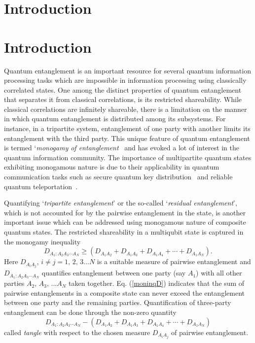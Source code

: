 \documentclass[pra,a4paper,showpacs,superscriptaddress]{revtex4}
\newcommand{\be}{\begin{equation}}
\newcommand{\ee}{\end{equation}}
\begin{document}
\section{Introduction} \section{Introduction} 
Quantum entanglement is an important resource for several quantum information processing tasks which are impossible in information processing using classically correlated states. One among the distinct properties of quantum entanglement that separates it from classical correlations, is its restricted shareability. While classical correlations are infinitely shareable, there is a limitation on the manner in which quantum entanglement is distributed among its subsystems. For instance, in a tripartite system, entanglement of one party with another limits its entanglement with the third party. This unique feature of quantum entanglement is termed `{\emph{monogamy of entanglement}}~\cite{ckw} and has evoked a lot of interest
\cite{ckw,osb,denw,ter,kw2,bs1,proof,hd,neg,hd2,newjmathphys2007,misc,22n,tripartite,bs2,misc1,misc2,
newpra2009,renyi,mixed,seevinck,cpb2010,njp,paw,bs3,gl,prabhu,sudha,bruss,eofm,xi,hf2,sqd,bai2,newpra2014,newqip,salini,pjg1,disent,
pjg2,tsallis,genwclass,pjg3,anyd,trenyi,noineq,tight,tightw,4qu,conassistw,polygon,qucorr,monqureview,z19} in the quantum information community. The importance of multipartite quantum states exhibiting monogamous nature is due to their applicability in quantum communication tasks such as secure quantum key distribution~\cite{ter,paw} and reliable quantum teleportation~\cite{z19}.  

Quantifying `{\emph{tripartite entanglement}}' or the so-called `{\emph{residual entanglement}}', which is not accounted for by the pairwise entanglement in the state, is another important issue which can be addressed using monogamous nature of composite quantum states. The restricted shareability in a multiqubit state is captured in the monogamy 
inequality 
\be
\label{moninqD}
D_{A_1:A_2A_3\cdots A_N}\geq \left( D_{A_{1}A_{2}}+ D_{A_{1}A_{3}}+D_{A_{1}A_{4}}+ \cdots+ D_{A_{1}A_{N}} \right).   
\ee
Here $D_{A_{i}A_{j}}$, $i\neq j=1,\,2,\,3\ldots N$ is a suitable measure of pairwise entanglement and 
$D_{A_1:A_2A_3\cdots A_N}$ quantifies entanglement between one party (say $A_1$) with all other parties $A_2,\,A_3,\,\ldots A_N$ taken together. 
Eq. (\ref{moninqD}) indicates that the sum of pairwise entanglements in a composite state can never exceed the entanglement between one party and the remaining parties. Quantification of three-party entanglement can be done through the non-zero quantity 
\be
\label{dcon}
D_{A_1:A_2A_3\cdots A_N}- \left( D_{A_{1}A_{2}}+ D_{A_{1}A_{3}}+D_{A_{1}A_{4}}+ \cdots+ D_{A_{1}A_{N}} \right)  
\ee  
called {\emph {tangle}} with respect to the chosen measure $D_{A_{i}A_{j}}$ of pairwise entanglement.  
\end{document}
